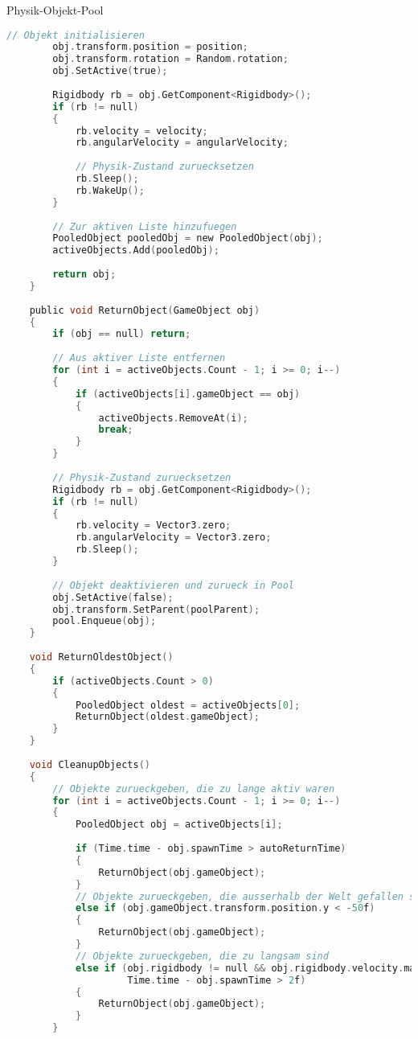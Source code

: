 \begin{code}{Physik-Objekt-Pool}
\begin{lstlisting}[language=C, style=basesmol]
        // Objekt initialisieren
        obj.transform.position = position;
        obj.transform.rotation = Random.rotation;
        obj.SetActive(true);
        
        Rigidbody rb = obj.GetComponent<Rigidbody>();
        if (rb != null) 
        {
            rb.velocity = velocity;
            rb.angularVelocity = angularVelocity;
            
            // Physik-Zustand zuruecksetzen
            rb.Sleep();
            rb.WakeUp();
        }
        
        // Zur aktiven Liste hinzufuegen
        PooledObject pooledObj = new PooledObject(obj);
        activeObjects.Add(pooledObj);
        
        return obj;
    }
    
    public void ReturnObject(GameObject obj) 
    {
        if (obj == null) return;
        
        // Aus aktiver Liste entfernen
        for (int i = activeObjects.Count - 1; i >= 0; i--) 
        {
            if (activeObjects[i].gameObject == obj) 
            {
                activeObjects.RemoveAt(i);
                break;
            }
        }
        
        // Physik-Zustand zuruecksetzen
        Rigidbody rb = obj.GetComponent<Rigidbody>();
        if (rb != null) 
        {
            rb.velocity = Vector3.zero;
            rb.angularVelocity = Vector3.zero;
            rb.Sleep();
        }
        
        // Objekt deaktivieren und zurueck in Pool
        obj.SetActive(false);
        obj.transform.SetParent(poolParent);
        pool.Enqueue(obj);
    }
    
    void ReturnOldestObject() 
    {
        if (activeObjects.Count > 0) 
        {
            PooledObject oldest = activeObjects[0];
            ReturnObject(oldest.gameObject);
        }
    }
    
    void CleanupObjects() 
    {
        // Objekte zurueckgeben, die zu lange aktiv waren
        for (int i = activeObjects.Count - 1; i >= 0; i--) 
        {
            PooledObject obj = activeObjects[i];
            
            if (Time.time - obj.spawnTime > autoReturnTime) 
            {
                ReturnObject(obj.gameObject);
            }
            // Objekte zurueckgeben, die ausserhalb der Welt gefallen sind
            else if (obj.gameObject.transform.position.y < -50f) 
            {
                ReturnObject(obj.gameObject);
            }
            // Objekte zurueckgeben, die zu langsam sind
            else if (obj.rigidbody != null && obj.rigidbody.velocity.magnitude < 0.1f && 
                     Time.time - obj.spawnTime > 2f) 
            {
                ReturnObject(obj.gameObject);
            }
        }
        

\end{lstlisting}
\end{code}
